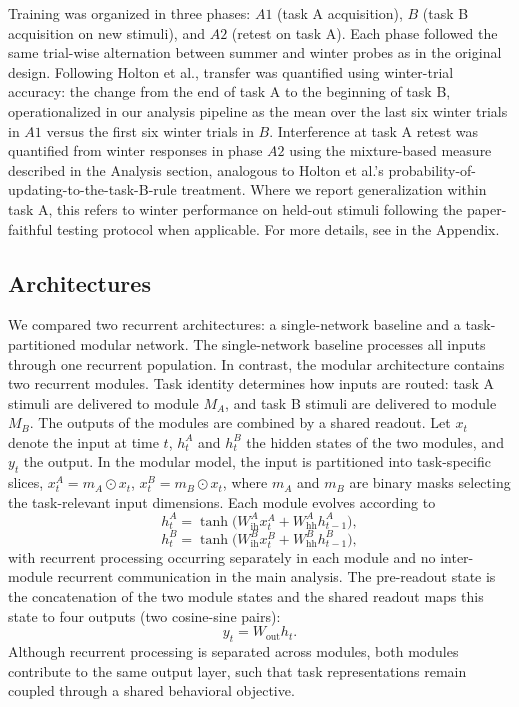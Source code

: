 \documentclass{article}
\theoremstyle{plain}
\theoremstyle{definition}
\theoremstyle{remark}
\begin{document}
        Training was organized in three phases: \(A1\) (task A acquisition), \(B\) (task B acquisition on new stimuli), and \(A2\) (retest on task A). Each phase followed the same trial-wise alternation between summer and winter probes as in the original design. Following Holton et al., transfer was quantified using winter-trial accuracy: the change from the end of task A to the beginning of task B, operationalized in our analysis pipeline as the mean over the last six winter trials in \(A1\) versus the first six winter trials in \(B\). Interference at task A retest was quantified from winter responses in phase \(A2\) using the mixture-based measure described in the Analysis section, analogous to Holton et al.'s probability-of-updating-to-the-task-B-rule treatment. Where we report generalization within task A, this refers to winter performance on held-out stimuli following the paper-faithful testing protocol when applicable. For more details, see  in the Appendix.
        
        \subsection{Architectures}
        
        We compared two recurrent architectures: a single-network baseline and a task-partitioned modular network. The single-network baseline processes all inputs through one recurrent population. In contrast, the modular architecture contains two recurrent modules. Task identity determines how inputs are routed: task A stimuli are delivered to module \(M_A\), and task B stimuli are delivered to module \(M_B\). The outputs of the modules are combined by a shared readout. Let \(x_t\) denote the input at time \(t\), \(h_t^A\) and \(h_t^B\) the hidden states of the two modules, and \(y_t\) the output. In the modular model, the input is partitioned into task-specific slices, $x_t^A = m_A \odot x_t$, $x_t^B = m_B \odot x_t$, where \(m_A\) and \(m_B\) are binary masks selecting the task-relevant input dimensions. Each module evolves according to
        \[
        h_t^A = \tanh\!\big(W_{\mathrm{ih}}^A x_t^A + W_{\mathrm{hh}}^A h_{t-1}^A\big),
        \]
        \[
        h_t^B = \tanh\!\big(W_{\mathrm{ih}}^B x_t^B + W_{\mathrm{hh}}^B h_{t-1}^B\big),
        \]
        with recurrent processing occurring separately in each module and no inter-module recurrent communication in the main analysis. The pre-readout state is the concatenation of the two module states
        and the shared readout maps this state to four outputs (two cosine-sine pairs):
        \[
        y_t = W_{\mathrm{out}} h_t.
        \]
        Although recurrent processing is separated across modules, both modules contribute to the same output layer, such that task representations remain coupled through a shared behavioral objective.
        
\end{document}
